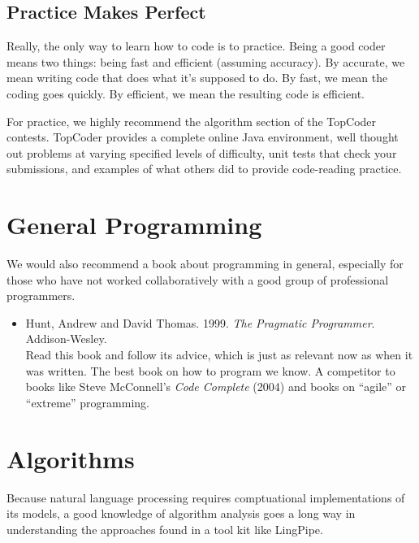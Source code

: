 


\subsection{Practice Makes Perfect}

\noindent
Really, the only way to learn how to code is to practice.  Being a
good coder means two things: being fast and efficient (assuming
accuracy).  By accurate, we mean writing code that does what it's
supposed to do.  By fast, we mean the coding goes quickly.  By efficient,
we mean the resulting code is efficient.

For practice, we highly recommend the algorithm section of the
TopCoder contests.  TopCoder provides a complete online Java
environment, well thought out problems at varying specified levels of
difficulty, unit tests that check your submissions, and examples of
what others did to provide code-reading practice.
%
\begin{quote}
\end{quote}
%



\section{General Programming}

\noindent
We would also recommend a book about programming in general, 
especially for those who have not worked collaboratively with
a good group of professional programmers.
%
\begin{itemize}
\item Hunt, Andrew and David Thomas.
1999.
{\it The Pragmatic Programmer}.
Addison-Wesley.
\\
{\footnotesize Read this book and follow its advice, which is just as relevant now
as when it was written.  The best book on how to program
we know.  A competitor to books like Steve McConnell's {\it Code Complete} (2004)
and books on ``agile'' or ``extreme'' programming.}
\end{itemize}


%


\section{Algorithms}

\noindent
Because natural language processing requires comptuational
implementations of its models, a good knowledge of algorithm analysis
goes a long way in understanding the approaches found in a tool kit
like LingPipe.

